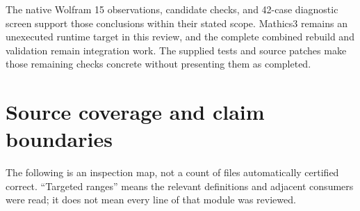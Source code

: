 \documentclass[11pt,letterpaper]{article}
\begin{document}
The native Wolfram 15 observations, candidate checks, and 42-case diagnostic screen support those conclusions within their stated scope. Mathics3 remains an unexecuted runtime target in this review, and the complete combined rebuild and validation remain integration work. The supplied tests and source patches make those remaining checks concrete without presenting them as completed.

\appendix
\section{Source coverage and claim boundaries}
\label{app:coverage}

The following is an inspection map, not a count of files automatically certified correct. ``Targeted ranges'' means the relevant definitions and adjacent consumers were read; it does not mean every line of that module was reviewed.
\end{document}
